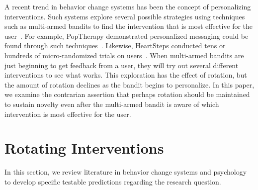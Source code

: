 A recent trend in behavior change systems has been the concept of personalizing interventions. Such systems explore several possible strategies using techniques such as multi-armed bandits to find the intervention that is most effective for the user~\cite{paredes2014poptherapy, rabbi2014automated}. For example, PopTherapy demonstrated personalized messaging could be found through such techniques~\cite{paredes2014poptherapy}. Likewise, HeartSteps conducted tens or hundreds of micro-randomized trials on users~\cite{doi:10.1111/j.1740-9713.2015.00863.x}.  When multi-armed bandits are just beginning to get feedback from a user, they will try out several different interventions to see what works. This exploration has the effect of rotation, but the amount of rotation declines as the bandit begins to personalize. In this paper, we examine the contrarian assertion that perhaps rotation should be maintained to sustain novelty even after the multi-armed bandit is aware of which intervention is most effective for the user.



\section{Rotating Interventions}
In this section, we review literature in behavior change systems and psychology to develop specific testable predictions regarding the research question.%

